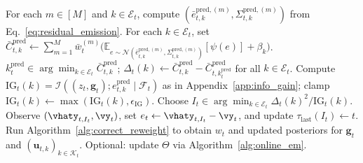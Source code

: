\begin{algorithm}[H]
\begin{algorithmic}[1]
    \STATE For each \(m\in[M]\) and \(k\in\mathcal{E}_t\), compute \((\bar e_{t,k}^{\mathrm{pred},(m)},\Sigma_{t,k}^{\mathrm{pred},(m)})\) from Eq.~\ref{eq:residual_emission}.
    \STATE For each \(k\in\mathcal{E}_t\), set \(\bar C_{t,k}^{\mathrm{pred}}\leftarrow \sum_{m=1}^M \bar w_t^{(m)}\big(\mathbb{E}_{e\sim\mathcal{N}(\bar e_{t,k}^{\mathrm{pred},(m)},\Sigma_{t,k}^{\mathrm{pred},(m)})}[\psi(e)]+\beta_k\big)\).
    \STATE \(k_t^{\mathrm{pred}} \in \arg\min_{k\in\mathcal{E}_t}\bar C_{t,k}^{\mathrm{pred}}\); \(\Delta_t(k)\leftarrow \bar C_{t,k}^{\mathrm{pred}}-\bar C_{t,k_t^{\mathrm{pred}}}^{\mathrm{pred}}\) for all \(k\in\mathcal{E}_t\).
    \STATE Compute \(\mathrm{IG}_t(k)=\mathcal{I}((z_t,\mathbf{g}_t);e_{t,k}^{\mathrm{pred}}\mid\mathcal{F}_t)\) as in Appendix~\ref{app:info_gain}; clamp \(\mathrm{IG}_t(k)\leftarrow \max(\mathrm{IG}_t(k),\epsilon_{\mathrm{IG}})\).
    \STATE Choose \(I_t \in \arg\min_{k\in\mathcal{E}_t}\Delta_t(k)^2/\mathrm{IG}_t(k)\).
    \STATE Observe \((\vhaty_{t,I_t},\vy_t)\), set \(e_t\leftarrow \vhaty_{t,I_t}-\vy_t\), and update \(\tau_{\mathrm{last}}(I_t)\leftarrow t\).
    \STATE Run Algorithm~\ref{alg:correct_reweight} to obtain \(w_t\) and updated posteriors for \(\mathbf{g}_t\) and \((\mathbf{u}_{t,k})_{k\in\mathcal{K}_t}\).
    \STATE Optional: update \(\Theta\) via Algorithm~\ref{alg:online_em}.
\ENDFOR
\end{algorithmic}
\end{algorithm}

